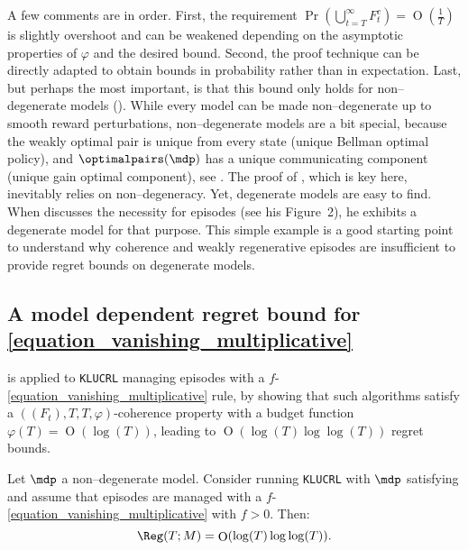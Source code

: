 \documentclass[preprint,cleveref,12pt]{colt2025}
\DeclarePairedDelimiter{\parens}{(}{)}	%
\DeclareMathOperator*{\OH}{\mathrm{O}}
\def\model{\mdp}
\def\optpairs{\optimalpairs}
\begin{document}
    A few comments are in order. 
    First, the requirement $\Pr(\bigcup_{t=T}^\infty F_t^c) = \OH(\frac 1T)$ is slightly overshoot and can be weakened depending on the asymptotic properties of $\varphi$ and the desired bound. 
    Second, the proof technique can be directly adapted to obtain bounds in probability rather than in expectation. 
    Last, but perhaps the most important, is that this bound only holds for non--degenerate models (). 
    While every model can be made non--degenerate up to smooth reward perturbations, non--degenerate models are a bit special, because the weakly optimal pair is unique from every state (unique Bellman optimal policy), and $\optpairs(\model)$ has a unique communicating component (unique gain optimal component), see .
    The proof of , which is key here, inevitably relies on non--degeneracy.
    Yet, degenerate models are easy to find.
    When \cite{ortner_online_2010} discusses the necessity for episodes (see his Figure~2), he exhibits a degenerate model for that purpose.
    This simple example is a good starting point to understand why coherence and weakly regenerative episodes are insufficient to provide regret bounds on degenerate models. 

    \subsection{A model dependent regret bound for \eqref{equation_vanishing_multiplicative}}

     is applied to \texttt{KLUCRL} managing episodes with a $f$-\eqref{equation_vanishing_multiplicative} rule, by showing that such algorithms satisfy a $((F_t), T, T, \varphi)$-coherence property with a budget function $\varphi(T) = \OH(\log(T))$, leading to $\OH(\log(T) \log\log(T))$ regret bounds.

    \begin{theorem}
    \label{theorem_model_dependent_regret}
        Let $\model$ a non--degenerate model.
        Consider running \texttt{KLUCRL} with $\model$ satisfying  and assume that episodes are managed with a $f$-\eqref{equation_vanishing_multiplicative} with $f > 0$.
        Then:
        \begin{equation}
            \Reg(T; M)
            = 
            \OH \parens*{
                \log(T) \log\log(T)
            }
            .
        \end{equation}
    \end{theorem}
\end{document}
